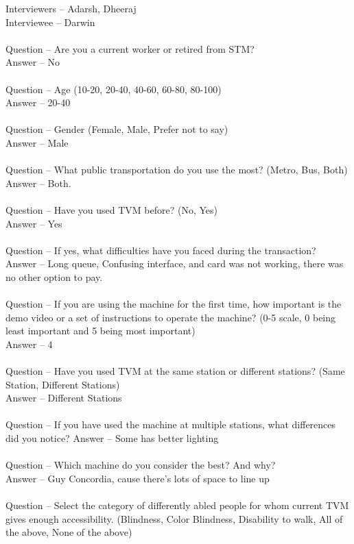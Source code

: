 \documentclass[a4paper, 11pt]{report}
\begin{document}
{Interviewers – Adarsh, Dheeraj\\
Interviewee – Darwin \\\\
Question – Are you a current worker or retired from STM?\\
Answer – No\\\\
Question – Age (10-20, 20-40, 40-60, 60-80, 80-100)\\
Answer – 20-40\\\\
Question – Gender (Female, Male, Prefer not to say)\\
Answer – Male\\\\
Question – What public transportation do you use the most? (Metro, Bus, Both)\\
Answer – Both.\\\\
Question – Have you used TVM before? (No, Yes)\\
Answer – Yes\\\\
Question – If yes, what difficulties have you faced during the transaction?\\
Answer – Long queue, Confusing interface, and card was not working, there was no other option to pay. \\\\
Question – If you are using the machine for the first time, how important is the demo video or a set of instructions to operate the machine? (0-5 scale, 0 being least important and 5 being most important)\\
Answer – 4\\\\
Question – Have you used TVM at the same station or different stations? (Same Station, Different Stations)\\
Answer – Different Stations\\\\
Question – If you have used the machine at multiple stations, what differences did you notice?
Answer – Some has better lighting\\\\
Question – Which machine do you consider the best? And why?\\
Answer – Guy Concordia, cause there's lots of space to line up\\\\
Question – Select the category of differently abled people for whom current TVM gives enough accessibility. (Blindness, Color Blindness, Disability to walk, All of the above, None of the above)\\
}
\end{document}
